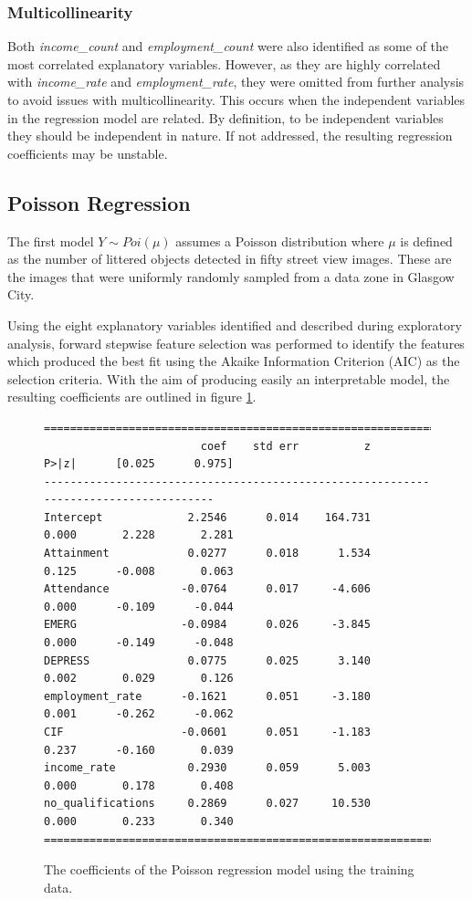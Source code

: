 \documentclass{thesis}
\begin{document}
\subsubsection{Multicollinearity}

Both \textit{income\_count} and \textit{employment\_count} were also identified as some of the most correlated explanatory variables. However, as they are highly correlated with \textit{income\_rate} and \textit{employment\_rate}, they were omitted from further analysis to avoid issues with multicollinearity. This occurs when the independent variables in the regression model are related. By definition, to be independent variables they should be independent in nature. If not addressed, the resulting regression coefficients may be unstable.

\subsection{Poisson Regression}

The first model $Y \sim Poi(\mu)$ assumes a Poisson distribution where $\mu$ is defined as the number of littered objects detected in fifty street view images. These are the images that were uniformly randomly sampled from a data zone in Glasgow City.

Using the eight explanatory variables identified and described during exploratory analysis, forward stepwise feature selection was performed to identify the features which produced the best fit using the Akaike Information Criterion (AIC) as the selection criteria. With the aim of producing easily an interpretable model, the resulting coefficients are outlined in figure \ref{fig:pos-coeff}.

\begin{figure}[h!]
    \centering
\footnotesize
\begin{verbatim}
=====================================================================================
                        coef    std err          z      P>|z|      [0.025      0.975]
-------------------------------------------------------------------------------------
Intercept             2.2546      0.014    164.731      0.000       2.228       2.281
Attainment            0.0277      0.018      1.534      0.125      -0.008       0.063
Attendance           -0.0764      0.017     -4.606      0.000      -0.109      -0.044
EMERG                -0.0984      0.026     -3.845      0.000      -0.149      -0.048
DEPRESS               0.0775      0.025      3.140      0.002       0.029       0.126
employment_rate      -0.1621      0.051     -3.180      0.001      -0.262      -0.062
CIF                  -0.0601      0.051     -1.183      0.237      -0.160       0.039
income_rate           0.2930      0.059      5.003      0.000       0.178       0.408
no_qualifications     0.2869      0.027     10.530      0.000       0.233       0.340
=====================================================================================
\end{verbatim}
\normalsize
    \caption{The coefficients of the Poisson regression model using the training data.}
    \label{fig:pos-coeff}
\end{figure}
\end{document}
